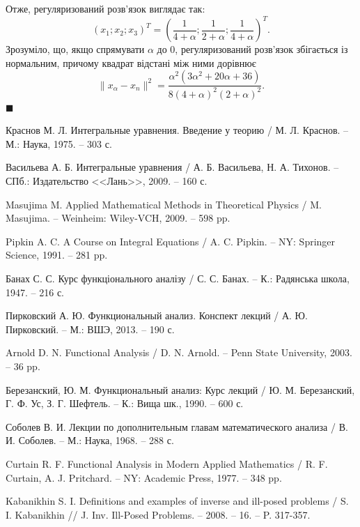 \documentclass[14pt,twoside]{extreport}
\theoremstyle{mystyle}
\numberwithin{equation}{chapter}
\begin{document}
\begin{small}
Отже, регуляризований розв'язок виглядає так:
\[
\left(x_1; x_2; x_3\right)^T = \left(\dfrac{1}{4+\alpha}; \dfrac{1}{2+\alpha}; \dfrac{1}{4 + \alpha}\right)^T.
\]
Зрозуміло, що, якщо спрямувати $\alpha$ до $0$, регуляризований розв'язок збігається із нормальним, причому квадрат відстані між ними дорівнює
\[
 \|x_{\alpha} - x_n\|^2 = \dfrac{\alpha^2(3\alpha^2 + 20\alpha + 36)}{8(4+\alpha)^2(2+\alpha)^2}.
\]
$\blacksquare$
\end{small}

\printindex

\begin{thebibliography}{20}
	
 Краснов М. Л. Интегральные уравнения. Введение у теорию / М. Л. Краснов. -- М.: Наука, 1975. -- 303 с.

 Васильева А. Б. Интегральные уравнения / А. Б. Васильева, Н. А. Тихонов. -- СПб.: Издательство <<Лань>>, 2009. -- 160 с.

 Masujima M. Applied Mathematical Methods in Theoretical Physics / M. Masujima. -- Weinheim: Wiley-VCH, 2009. -- 598 pp.

 Pipkin A. C. A Course on Integral Equations / A. C. Pipkin. -- NY: Springer Science, 1991. -- 281 pp.

 Банах С. С. Курс функціонального аналізу / С. С. Банах. -- К.: Радянська школа, 1947. -- 216 с.

 Пирковский А. Ю. Функциональный анализ. Конспект лекций / А. Ю. Пирковский. -- М.: ВШЭ, 2013. -- 190 с.

 Arnold D. N. Functional Analysis / D. N. Arnold. -- Penn State University, 2003. -- 36 pp.

 Березанский, Ю. М. Функциональный анализ: Курс лекций / Ю. М. Березанский, Г. Ф. Ус, З. Г. Шефтель. – К.: Вища шк., 1990. – 600 с.

 Соболев В. И. Лекции по дополнительным главам математического анализа / В. И. Соболев. -- М.: Наука, 1968. -- 288 с.



 Curtain R. F. Functional Analysis in  Modern Applied Mathematics / R. F. Curtain, A. J. Pritchard. -- NY: Academic Press, 1977. -- 348 pp.

 Kabanikhin S. I. Definitions and examples of inverse and ill-posed problems / S. I. Kabanikhin // J. Inv. Ill-Posed Problems. -- 2008. -- 16. -- P. 317-357.


\end{thebibliography}
\end{document}
